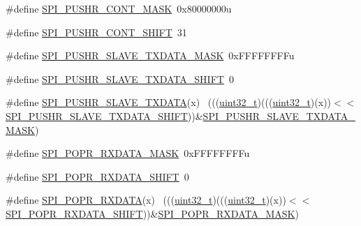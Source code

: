 \begin{DoxyCompactItemize}
\item 
\#define \hyperlink{group___s_p_i___register___masks_gac28b0accd475a1a991ccece8d1333ae0}{S\+P\+I\+\_\+\+P\+U\+S\+H\+R\+\_\+\+C\+O\+N\+T\+\_\+\+M\+A\+SK}~0x80000000u
\item 
\#define \hyperlink{group___s_p_i___register___masks_gab114a13d8478311e8b77778d4cbd5d96}{S\+P\+I\+\_\+\+P\+U\+S\+H\+R\+\_\+\+C\+O\+N\+T\+\_\+\+S\+H\+I\+FT}~31
\item 
\#define \hyperlink{group___s_p_i___register___masks_ga70296421b5faddc6c9fbbb984685b5a0}{S\+P\+I\+\_\+\+P\+U\+S\+H\+R\+\_\+\+S\+L\+A\+V\+E\+\_\+\+T\+X\+D\+A\+T\+A\+\_\+\+M\+A\+SK}~0x\+F\+F\+F\+F\+F\+F\+F\+Fu
\item 
\#define \hyperlink{group___s_p_i___register___masks_gaa965b8c34dc45034184a2cad39a0b825}{S\+P\+I\+\_\+\+P\+U\+S\+H\+R\+\_\+\+S\+L\+A\+V\+E\+\_\+\+T\+X\+D\+A\+T\+A\+\_\+\+S\+H\+I\+FT}~0
\item 
\#define \hyperlink{group___s_p_i___register___masks_ga7224e49e3e609c3402d9b069f906fc5a}{S\+P\+I\+\_\+\+P\+U\+S\+H\+R\+\_\+\+S\+L\+A\+V\+E\+\_\+\+T\+X\+D\+A\+TA}(x)                            ~(((\hyperlink{_p_e___types_8h_a33594304e786b158f3fb30289278f5af}{uint32\+\_\+t})(((\hyperlink{_p_e___types_8h_a33594304e786b158f3fb30289278f5af}{uint32\+\_\+t})(x))$<$$<$\hyperlink{group___s_p_i___register___masks_gaa965b8c34dc45034184a2cad39a0b825}{S\+P\+I\+\_\+\+P\+U\+S\+H\+R\+\_\+\+S\+L\+A\+V\+E\+\_\+\+T\+X\+D\+A\+T\+A\+\_\+\+S\+H\+I\+FT}))\&\hyperlink{group___s_p_i___register___masks_ga70296421b5faddc6c9fbbb984685b5a0}{S\+P\+I\+\_\+\+P\+U\+S\+H\+R\+\_\+\+S\+L\+A\+V\+E\+\_\+\+T\+X\+D\+A\+T\+A\+\_\+\+M\+A\+SK})
\item 
\#define \hyperlink{group___s_p_i___register___masks_ga3d2d3998529fd7de17cac99d625fe004}{S\+P\+I\+\_\+\+P\+O\+P\+R\+\_\+\+R\+X\+D\+A\+T\+A\+\_\+\+M\+A\+SK}~0x\+F\+F\+F\+F\+F\+F\+F\+Fu
\item 
\#define \hyperlink{group___s_p_i___register___masks_ga862819a722e0ccbd3f03edce9b82e5c2}{S\+P\+I\+\_\+\+P\+O\+P\+R\+\_\+\+R\+X\+D\+A\+T\+A\+\_\+\+S\+H\+I\+FT}~0
\item 
\#define \hyperlink{group___s_p_i___register___masks_ga2db032374de6c0b438ace671578d6464}{S\+P\+I\+\_\+\+P\+O\+P\+R\+\_\+\+R\+X\+D\+A\+TA}(x)                                          ~(((\hyperlink{_p_e___types_8h_a33594304e786b158f3fb30289278f5af}{uint32\+\_\+t})(((\hyperlink{_p_e___types_8h_a33594304e786b158f3fb30289278f5af}{uint32\+\_\+t})(x))$<$$<$\hyperlink{group___s_p_i___register___masks_ga862819a722e0ccbd3f03edce9b82e5c2}{S\+P\+I\+\_\+\+P\+O\+P\+R\+\_\+\+R\+X\+D\+A\+T\+A\+\_\+\+S\+H\+I\+FT}))\&\hyperlink{group___s_p_i___register___masks_ga3d2d3998529fd7de17cac99d625fe004}{S\+P\+I\+\_\+\+P\+O\+P\+R\+\_\+\+R\+X\+D\+A\+T\+A\+\_\+\+M\+A\+SK})

\end{DoxyCompactItemize}

